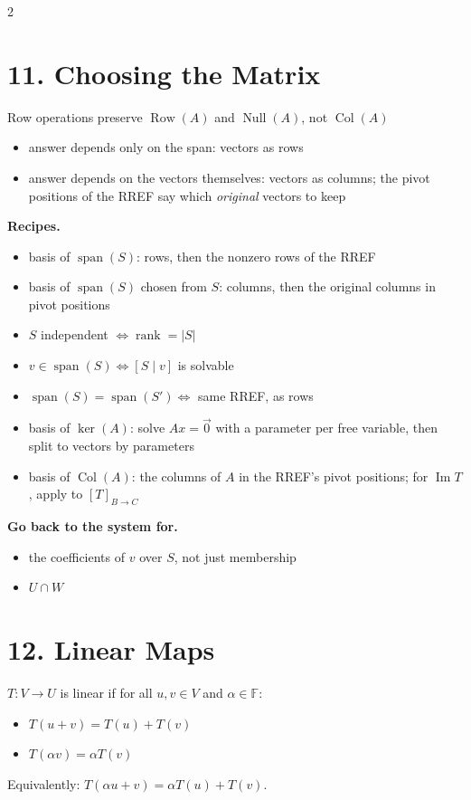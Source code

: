 \documentclass[fleqn]{article}
\newcommand{\subhead}[1]{\medskip\noindent\textbf{#1}}
\begin{document}
\begin{multicols}{2}
\section*{11. Choosing the Matrix}
Row operations preserve $\operatorname{Row}(A)$ and $\operatorname{Null}(A)$, not $\operatorname{Col}(A)$
\begin{itemize}
\item answer depends only on the span: vectors as rows
\item answer depends on the vectors themselves: vectors as columns; the pivot positions of the RREF say which \emph{original} vectors to keep
\end{itemize}

\subhead{Recipes.}
\begin{itemize}
\item basis of $\operatorname{span}(S)$: rows, then the nonzero rows of the RREF
\item basis of $\operatorname{span}(S)$ chosen from $S$: columns, then the original columns in pivot positions
\item $S$ independent $\iff \operatorname{rank} = |S|$
\item $v \in \operatorname{span}(S) \iff [S \mid v]$ is solvable
\item $\operatorname{span}(S) = \operatorname{span}(S') \iff$ same RREF, as rows
\item basis of $\ker(A)$: solve $Ax=\vec{0}$ with a parameter per free variable, then split to vectors by parameters
\item basis of $\operatorname{Col}(A)$: the columns of $A$ in the RREF's pivot positions; for $\operatorname{Im}T$, apply to $[T]_{B \to C}$
\end{itemize}

\subhead{Go back to the system for.}
\begin{itemize}
\item the coefficients of $v$ over $S$, not just membership
\item $U \cap W$
\end{itemize}

\section*{12. Linear Maps}
$T:V \to U$ is linear if for all $u,v \in V$ and $\alpha \in \mathbb{F}$:
\begin{itemize}
\item $T(u+v)=T(u)+T(v)$
\item $T(\alpha v)=\alpha T(v)$
\end{itemize}
Equivalently: $T(\alpha u + v) = \alpha T(u) + T(v)$.


\end{multicols}
\end{document}
